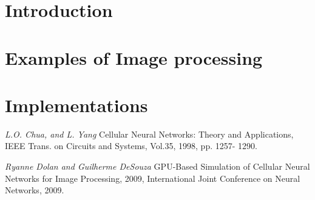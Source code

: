 \documentclass{vskpou} %
\begin{document}
\section{Introduction}


\section{Examples of Image processing}


\section{Implementations}


\stranyresume

\begin{thebibliography}{9}

\textit{ L.O. Chua, and L. Yang} Cellular Neural Networks: Theory and
Applications, IEEE Trans. on Circuits and Systems, Vol.35, 1998, pp. 1257-
1290. 

\textit{Ryanne Dolan and Guilherme DeSouza} GPU-Based Simulation of Cellular Neural Networks
for Image Processing, 2009, International Joint Conference on Neural Networks, 2009.




\begin{comment}
Examples


 
\bibitem{Hruby-Kubat} Hrubý,~D., Kubát,~J. \textit{Matematika pro gymnázia: Diferenciální a integrální počet.} 1.\,vydání. Praha: Prometheus, 1997. \ISBN{80-7196-063-2}. Kapitola~6, Určitý integrál, s.\,150--178.

\bibitem{Knuth} Knuth,~D.~E. \textit{The \TeX book.} Reading, Massachusetts: Addison-Wesley, 1984. \ISBN{0-201-13447-0}.

\bibitem{fancy} Moravec, David. Balíček \texttt{fancyhdr.sty}. \textit{Zpravodaj Československého sdružení uživatelů \TeX u} [online]. 2001, roč.\,11, č.\,4, s.\,186--195. \ISSN{1211-6661}. Dostupné z~\url{http://bulletin.cstug.cz/pdf/}.

\bibitem{Mandelbrot} Wikipedia contributors. \textit{Mandelbrot Set} [online]. Wikipedia: The Free Encyclopedia, c2009, datum poslední revize 22.\,10.\,2009 [citováno 22.\,10.\,2009].
\url{http://en.wikipedia.org/wiki/Mandelbrot_set}.

\bibitem{TeX} Přispěvatelé wikipedie. \textit{\TeX} [online]. Wikipedie: Otevřená encyklopedie, c2009, datum poslední revize 7.\,10.\,2009 [citováno 22.\,10.\,2009].
\url{http://cs.wikipedia.org/wiki/TeX}.
\end{comment}
\end{thebibliography}
\end{document}
